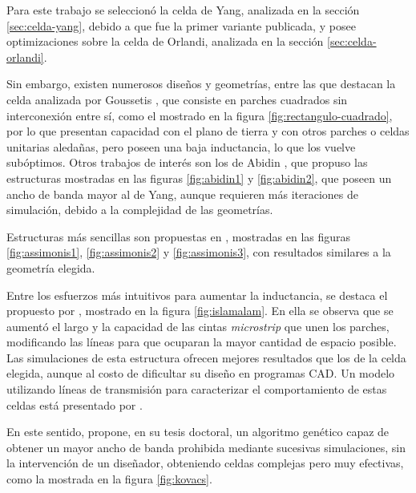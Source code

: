 Para este trabajo se seleccionó la celda de Yang, analizada en la sección \ref{sec:celda-yang}, debido a que fue la primer variante publicada, y posee optimizaciones sobre la celda de Orlandi, analizada en la sección \ref{sec:celda-orlandi}.

Sin embargo, existen numerosos diseños y geometrías, entre las que destacan la celda analizada por Goussetis \cite{Goussetis:TailoringAMCEBGCharacteristics}, que consiste en parches cuadrados sin interconexión entre sí, como el mostrado en la figura \ref{fig:rectangulo-cuadrado}, por lo que presentan capacidad con el plano de tierra y con otros parches o celdas unitarias aledañas, pero poseen una baja inductancia, lo que los vuelve subóptimos. Otros trabajos de interés son los de Abidin \cite{Abidin;Thesis}, que propuso las estructuras mostradas en las figuras \ref{fig:abidin1} y \ref{fig:abidin2}, que poseen un ancho de banda mayor al de Yang, aunque requieren más iteraciones de simulación, debido a la complejidad de las geometrías.

Estructuras más sencillas son propuestas en \cite{Asimonis:designoptimization}, mostradas en las figuras \ref{fig:assimonis1}, \ref{fig:assimonis2} y \ref{fig:assimonis3}, con resultados similares a la geometría elegida.

Entre los esfuerzos más intuitivos para aumentar la inductancia, se destaca el propuesto por \cite{IslamAlam:CompactEBG}, mostrado en la figura \ref{fig:islamalam}. En ella se observa que se aumentó el largo y la capacidad de las cintas \textit{microstrip} que unen los parches, modificando las líneas para que ocuparan la mayor cantidad de espacio posible. Las simulaciones de esta estructura ofrecen mejores resultados que los de la celda elegida, aunque al costo de dificultar su diseño en programas \textsc{CAD}. Un modelo utilizando líneas de transmisión para caracterizar el comportamiento de estas celdas está presentado por \cite{Venkateswaran:Thesis}. 

En este sentido, \cite{Kovacs:DesignOptimization} propone, en su tesis doctoral, un algoritmo genético capaz de obtener un mayor ancho de banda prohibida mediante sucesivas simulaciones, sin la intervención de un diseñador, obteniendo celdas complejas pero muy efectivas, como la mostrada en la figura \ref{fig:kovacs}.


